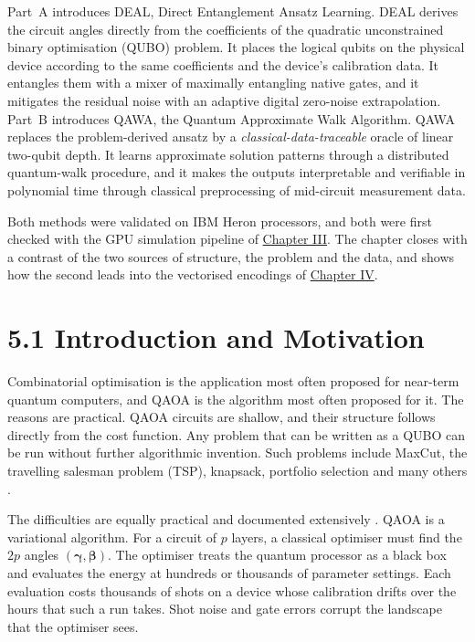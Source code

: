 \documentclass{report}
\theoremstyle{plain}
\theoremstyle{definition}
\theoremstyle{remark}
\begin{document}
Part~A introduces DEAL, Direct Entanglement Ansatz Learning. DEAL derives the circuit angles directly from the coefficients of the quadratic unconstrained binary optimisation (QUBO) problem. It places the logical qubits on the physical device according to the same coefficients and the device's calibration data. It entangles them with a mixer of maximally entangling native gates, and it mitigates the residual noise with an adaptive digital zero-noise extrapolation. Part~B introduces QAWA, the Quantum Approximate Walk Algorithm. QAWA replaces the problem-derived ansatz by a \emph{classical-data-traceable} oracle of linear two-qubit depth. It learns approximate solution patterns through a distributed quantum-walk procedure, and it makes the outputs interpretable and verifiable in polynomial time through classical preprocessing of mid-circuit measurement data.

Both methods were validated on IBM Heron processors, and both were first checked with the GPU simulation pipeline of \hyperref[ch:qgear]{Chapter III}. The chapter closes with a contrast of the two sources of structure, the problem and the data, and shows how the second leads into the vectorised encodings of \hyperref[ch:qml]{Chapter IV}.

\section{5.1 Introduction and Motivation}\label{sec:nisq:intro}

Combinatorial optimisation is the application most often proposed for near-term quantum computers, and QAOA \cite{farhi2014qaoa} is the algorithm most often proposed for it. The reasons are practical. QAOA circuits are shallow, and their structure follows directly from the cost function. Any problem that can be written as a QUBO can be run without further algorithmic invention. Such problems include MaxCut, the travelling salesman problem (TSP), knapsack, portfolio selection and many others \cite{glover2018qubo}.

The difficulties are equally practical and documented extensively \cite{abbas2024challengesqopt,weidenfeller2022qaoascaling,cerezo2021vqa}. QAOA is a variational algorithm. For a circuit of $p$ layers, a classical optimiser must find the $2p$ angles $(\bm{\gamma},\bm{\beta})$. The optimiser treats the quantum processor as a black box and evaluates the energy at hundreds or thousands of parameter settings. Each evaluation costs thousands of shots on a device whose calibration drifts over the hours that such a run takes. Shot noise and gate errors corrupt the landscape that the optimiser sees.
\end{document}
